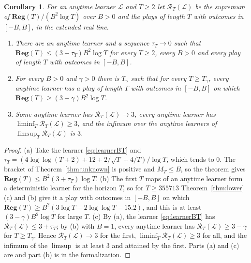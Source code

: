 \documentclass[12pt]{amsart}
\newtheorem{corollary}[theorem]{Corollary}
\theoremstyle{definition}
\numberwithin{equation}{section}
\newcommand{\Reg}{\mathbf{Reg}}
\newcommand{\leanmap}[1]{\ignorespaces}
\newcommand{\mapnote}[1]{\ignorespaces}
\begin{document}
\begin{corollary}\label{cor:unknown}
\leanmap{RegretKappa.UnknownBT.UB.answer, RegretKappa.UnknownBT.optimality,
  RegretKappa.UnknownBT.everyT_of_scaleFreeBound, RegretKappa.UnknownBT.bestConstantThree_of_bounds,
  RegretKappa.UnknownBT.bestConstant_eq_three}
\mapnote{(a), (b) and (c) are \lname{RegretKappa.UnknownBT.UnknownBTEveryT}, \lname{RegretKappa.UnknownBT.Optimality}, \lname{RegretKappa.UnknownBT.BestConstantThree} and \lname{RegretKappa.UnknownBT.bestConstant} equal to $3$, with $\mathcal R_T$ as \lname{RegretKappa.UnknownBT.worstRatio} in the extended real numbers (value $0$ for $T\le1$, which no statement about large $T$ sees); \lname{RegretKappa.UnknownBT.UB.answer} also gives the eventual form of (a) and its two halves with $B$ known or $T$ known (\lname{RegretKappa.UnknownBT.UnknownBT}, \lname{RegretKappa.UnknownBT.UnknownT}, \lname{RegretKappa.UnknownBT.UnknownB}).}
For an anytime learner $\mathcal L$ and $T\ge2$ let $\mathcal R_T(\mathcal L)$ be the supremum of $\Reg(T)/(B^2\log T)$ over $B>0$ and the plays of length $T$ with outcomes in $[-B,B]$, in the extended real line.
\begin{enumerate}
\item[(a)] There are an anytime learner and a sequence $\tau_T\to0$ such that $\Reg(T)\le(3+\tau_T)B^2\log T$ for every $T\ge2$, every $B>0$ and every play of length $T$ with outcomes in $[-B,B]$.
\item[(b)] For every $B>0$ and $\gamma>0$ there is $T_\gamma$ such that for every $T\ge T_\gamma$, every anytime learner has a play of length $T$ with outcomes in $[-B,B]$ on which $\Reg(T)\ge(3-\gamma)B^2\log T$.
\item[(c)] Some anytime learner has $\mathcal R_T(\mathcal L)\to3$, every anytime learner has $\liminf_T\mathcal R_T(\mathcal L)\ge3$, and the infimum over the anytime learners of $\limsup_T\mathcal R_T(\mathcal L)$ is $3$.
\end{enumerate}
\end{corollary}

\begin{proof}
(a) Take the learner \eqref{eq:learnerBT} and $\tau_T=(4\log\log(T+2)+12+2/\sqrt T+4/T)/\log T$, which tends to $0$. The bracket of Theorem~\ref{thm:unknown} is positive and $M_T\le B$, so the theorem gives $\Reg(T)\le B^2(3+\tau_T)\log T$. (b) The first $T$ maps of an anytime learner form a deterministic learner for the horizon $T$, so for $T\ge355713$ Theorem~\ref{thm:lower}(c) and (b) give it a play with outcomes in $[-B,B]$ on which $\Reg(T)\ge B^2(3\log T-2\log\log T-15.2)$, and this is at least $(3-\gamma)B^2\log T$ for large $T$. (c) By (a), the learner \eqref{eq:learnerBT} has $\mathcal R_T(\mathcal L)\le3+\tau_T$; by (b) with $B=1$, every anytime learner has $\mathcal R_T(\mathcal L)\ge3-\gamma$ for $T\ge T_\gamma$. Hence $\mathcal R_T(\mathcal L)\to3$ for the first, $\liminf_T\mathcal R_T(\mathcal L)\ge3$ for all, and the infimum of the $\limsup$ is at least $3$ and attained by the first. Parts (a) and (c) are  and part (b) is  in the formalization.
\end{proof}
\end{document}
